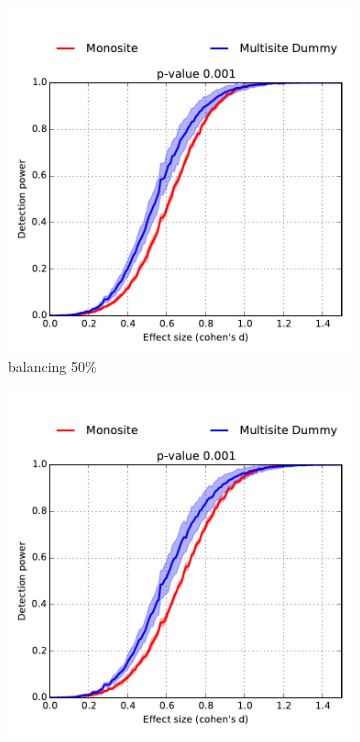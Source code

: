 \documentclass[authoryear]{elsarticle}
\begin{document}
\begin{figure}
        \centering
        \begin{subfigure}[b]{0.31\textwidth}
            \centering
            \includegraphics[width=\textwidth]{../figures/realdata_detect_pow_sitepatho_s120_50pct.pdf}
            {{\tiny balancing 50\%}}    
            \label{fig:mean and std of net14}
        \end{subfigure}
        \hfill
        \begin{subfigure}[b]{0.31\textwidth}  
            \centering 
            \includegraphics[width=\textwidth]{../figures/realdata_detect_pow_sitepatho_s120_30pct.pdf}

\end{subfigure}
\end{figure}
\end{document}
